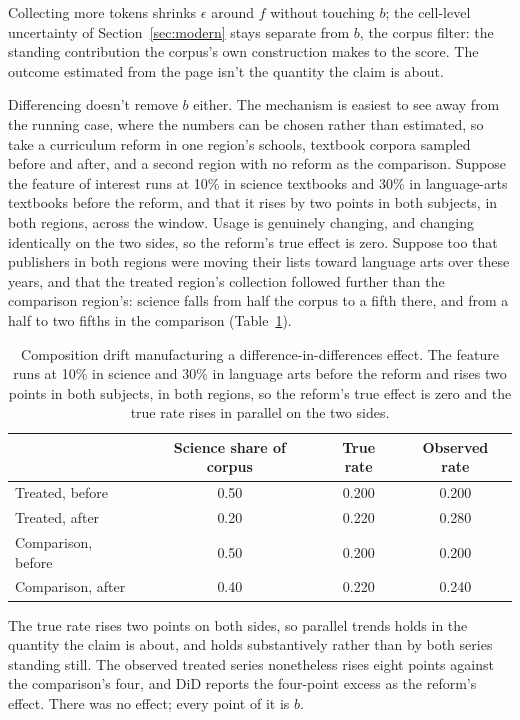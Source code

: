 Collecting more tokens shrinks $\epsilon$ around $f$ without touching $b$; the cell-level uncertainty of Section~\ref{sec:modern} stays separate from $b$, the corpus filter: the standing contribution the corpus's own construction makes to the score. The outcome estimated from the page isn't the quantity the claim is about.

Differencing doesn't remove $b$ either. The mechanism is easiest to see away from the running case, where the numbers can be chosen rather than estimated, so take a curriculum reform in one region's schools, textbook corpora sampled before and after, and a second region with no reform as the comparison. Suppose the feature of interest runs at 10\% in science textbooks and 30\% in language-arts textbooks before the reform, and that it rises by two points in both subjects, in both regions, across the window. Usage is genuinely changing, and changing identically on the two sides, so the reform's true effect is zero. Suppose too that publishers in both regions were moving their lists toward language arts over these years, and that the treated region's collection followed further than the comparison region's: science falls from half the corpus to a fifth there, and from a half to two fifths in the comparison (Table~\ref{tab:composition-artifact}).

\begin{table}[!ht]
\centering
\footnotesize
\caption{Composition drift manufacturing a difference-in-differences effect. The feature runs at 10\% in science and 30\% in language arts before the reform and rises two points in both subjects, in both regions, so the reform's true effect is zero and the true rate rises in parallel on the two sides.}
\label{tab:composition-artifact}
\begin{tabular}{@{}l c c c@{}}
\toprule
 & Science share of corpus & True rate & Observed rate \\
\midrule
Treated, before    & 0.50 & 0.200 & 0.200 \\
Treated, after     & 0.20 & 0.220 & 0.280 \\
Comparison, before & 0.50 & 0.200 & 0.200 \\
Comparison, after  & 0.40 & 0.220 & 0.240 \\
\bottomrule
\end{tabular}
\end{table}

The true rate rises two points on both sides, so parallel trends holds in the quantity the claim is about, and holds substantively rather than by both series standing still. The observed treated series nonetheless rises eight points against the comparison's four, and DiD reports the four-point excess as the reform's effect. There was no effect; every point of it is $b$.

